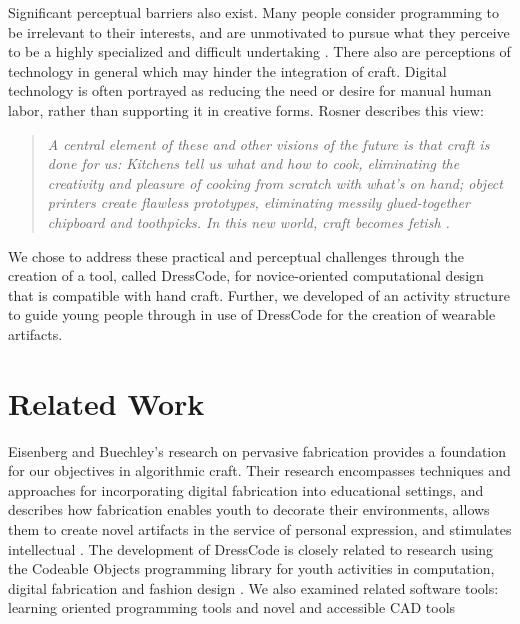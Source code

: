 \documentclass{sigchi}
\begin{document}
Significant perceptual barriers also exist. Many people consider programming to be irrelevant to their interests, and are unmotivated to pursue what they perceive to be a highly specialized and difficult undertaking \cite{resnick1}. There also are perceptions of technology in general which may hinder the integration of craft. Digital technology is often portrayed as reducing the need or desire for manual human labor, rather than supporting it in creative forms. Rosner describes this view:

\begin{quotation}
 \textit{A central element of these and other visions of the future is that craft is done for us: Kitchens tell us what and how to cook, eliminating the creativity and pleasure of cooking from scratch with what's on hand; object printers create flawless prototypes, eliminating messily glued-together chipboard and toothpicks. In this new world, craft becomes fetish \cite{rosner_craft_vs_design}.}
\end{quotation}

We chose to address these practical and perceptual challenges through the creation of a tool, called DressCode, for novice-oriented computational design that is compatible with hand craft. Further, we developed of an activity structure to guide young people through in use of DressCode for the creation of wearable artifacts.

\section{Related Work}
Eisenberg and Buechley's research on pervasive fabrication provides a foundation for our objectives in algorithmic craft. Their research encompasses techniques and approaches for incorporating digital fabrication into educational settings, and describes how fabrication enables youth to decorate their environments, allows them to create novel artifacts in the service of personal expression, and stimulates intellectual  \cite{pervasive_fab}. The development of DressCode is closely related to research using the Codeable Objects programming library for youth activities in computation, digital fabrication and fashion design \cite{codeable_objects}. We also examined related software tools: learning oriented programming tools and novel and accessible CAD tools
\end{document}
